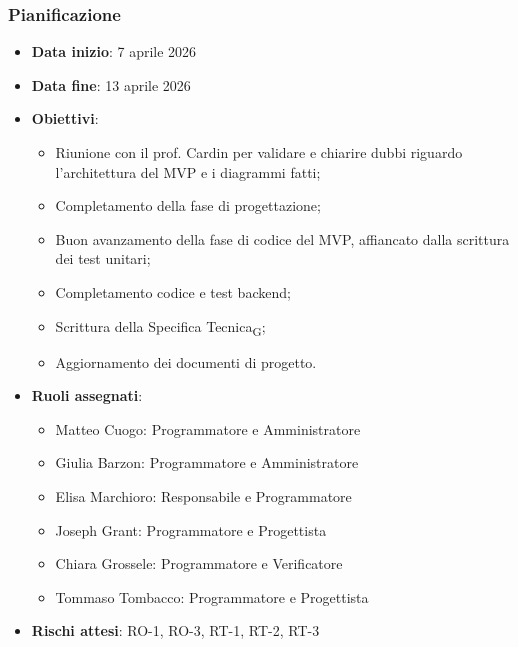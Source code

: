\documentclass[11pt,a4paper]{article}
\newcommand{\gls}[1]{#1\textsubscript{G}}
\begin{document}
\subsubsection{Pianificazione}
\begin{itemize}
    \item \textbf{Data inizio}: 7 aprile 2026
    \item \textbf{Data fine}: 13 aprile 2026
        \item \textbf{Obiettivi}:
    \begin{itemize}
        \item Riunione con il prof. Cardin per validare e chiarire dubbi riguardo l'architettura del MVP e i diagrammi fatti;
        \item Completamento della fase di progettazione;
        \item Buon avanzamento della fase di codice del MVP, affiancato dalla scrittura dei test unitari;
        \item Completamento codice e test backend;
        \item Scrittura della \gls{Specifica Tecnica};
        \item Aggiornamento dei documenti di progetto.
    \end{itemize}
    
    \item \textbf{Ruoli assegnati}:
    \begin{itemize}
        \item Matteo Cuogo: Programmatore e Amministratore
        \item Giulia Barzon: Programmatore e Amministratore
        \item Elisa Marchioro: Responsabile e Programmatore
        \item Joseph Grant: Programmatore e Progettista
        \item Chiara Grossele: Programmatore e Verificatore
        \item Tommaso Tombacco: Programmatore e Progettista
    \end{itemize}
    \item \textbf{Rischi attesi}: RO-1, RO-3, RT-1, RT-2, RT-3
\end{itemize}
\end{document}
